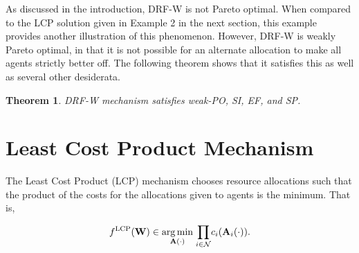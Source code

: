 \documentclass[letterpaper]{article} %
\newtheorem{theorem}{Theorem}
\theoremstyle{definition}
\begin{document}
As discussed in the introduction, DRF-W is not Pareto optimal.  When compared to the LCP solution given in Example 2 in the next section, this example provides another illustration of this phenomenon.
However, DRF-W is weakly Pareto optimal, in that it is not possible for an alternate allocation to make all agents strictly better off.  The following theorem shows that it satisfies this as well as several other desiderata.

\begin{theorem} \label{drf-w_properties}
DRF-W mechanism satisfies weak-PO, SI, EF, and SP.
\end{theorem}

\fi

\section{Least Cost Product Mechanism} \label{LCP}

\noindent The Least Cost Product (LCP) mechanism chooses resource allocations such that the product of the costs for the allocations given to agents is the minimum. That is,
\begin{linenomath}
\begin{equation*}
    {f}^{\textnormal{LCP}}(\mathbf{W}) \in \underset{\mathbf{A}(\cdot)}{\arg\min} \; \underset{i \in \mathcal{N}}{\displaystyle \prod}  c_{i}(\mathbf{A}_{i}(\cdot)).
\end{equation*}
\end{linenomath}
\end{document}

